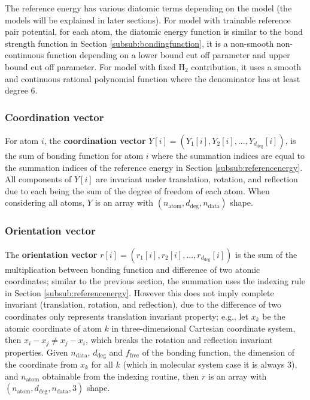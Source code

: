 \documentclass[12pt]{article}
\begin{document}
The reference energy has various diatomic terms depending on the model (the models will be explained in later sections). For model with trainable reference pair potential, for each atom, the diatomic energy function is similar to the bond strength function in Section \ref{subsub:bondingfunction}, it is a non-smooth non-continuous function depending on a lower bound cut off parameter and upper bound cut off parameter. For model with fixed H$_2$ contribution, it uses a smooth and continuous rational polynomial function where the denominator has at least degree 6. 


\subsubsection{Coordination vector}
For atom $i$, the \textbf{coordination vector} $Y[i] = (Y_1[i], Y_2[i], ..., Y_{d_{\text{deg}}}[i])$, is the sum of bonding function for atom $i$ where the summation indices are equal to the summation indices of the reference energy in Section \ref{subsub:referencenergy}. All components of $Y[i]$ are invariant under translation, rotation, and reflection due to each being the sum of the degree of freedom of each atom. When considering all atoms, $Y$ is an array with $(n_{\text{atom}}, d_{\text{deg}}, n_{\text{data}})$ shape.

\subsubsection{Orientation vector}
The \textbf{orientation vector} $r[i] = (r_1[i], r_2[i], ..., r_{d_{\text{deg}}}[i])$ is the sum of the multiplication between bonding function and difference of two atomic coordinates; similar to the previous section, the summation uses the indexing rule in Section \ref{subsub:referencenergy}. However this does not imply complete invariant (translation, rotation, and reflection), due to the difference of two coordinates only represents translation invariant property; e.g., let $x_k$ be the atomic coordinate of atom $k$ in three-dimensional Cartesian coordinate system, then $x_i - x_j \neq x_j - x_i$, which breaks the rotation and reflection invariant properties. Given $n_{\text{data}}$, $d_{\text{deg}}$ and $f_{\text{free}}$ of the bonding function, the dimension of the coordinate from $x_k$ for all $k$ (which in molecular system case it is always $3$), and $n_{\text{atom}}$ obtainable from the indexing routine, then $r$ is an array with $(n_{\text{atom}}, d_{\text{deg}}, n_{\text{data}}, 3)$ shape.
\end{document}
